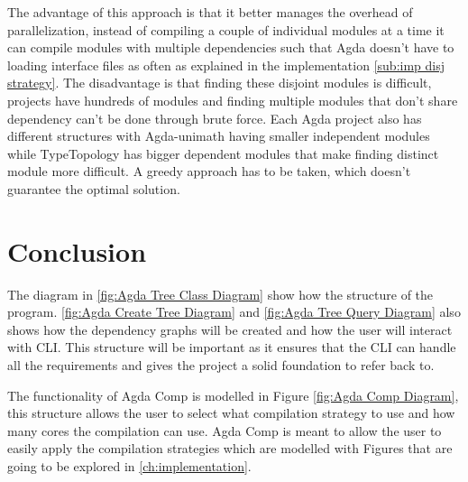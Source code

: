 The advantage of this approach is that it better manages the overhead of
parallelization, instead of compiling a couple of individual modules at a time
it can compile modules with multiple dependencies such that Agda doesn't have
to loading interface files as often as explained in the implementation
\cref{sub:imp disj strategy}. The disadvantage is that finding these
disjoint modules is difficult, projects  have hundreds of modules and finding
multiple modules that don't share dependency can't be done through brute force.
Each Agda project also has different structures with Agda-unimath having
smaller independent modules while TypeTopology has bigger dependent modules
that make finding distinct module more difficult. A greedy approach has to be
taken, which doesn't guarantee the optimal solution.



\pagebreak

\section{Conclusion}

The diagram in \cref{fig:Agda Tree Class Diagram} show how the structure
of the program. \cref{fig:Agda Create Tree Diagram} and \cref{fig:Agda Tree Query Diagram} also shows how the dependency graphs will be created and
how the user will interact with CLI. This structure will be important as it
ensures that the CLI can handle all the requirements and gives the project a
solid foundation to refer back to. 

The functionality of Agda Comp is modelled in Figure \cref{fig:Agda Comp Diagram}, this structure allows the user to select what compilation strategy to
use and how many cores the compilation can use. Agda Comp is meant to allow the
user to easily apply the compilation strategies which are modelled with Figures that are going to be explored
in \cref{ch:implementation}.

%

